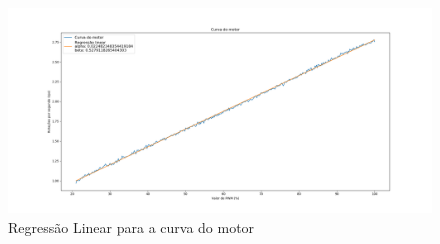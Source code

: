 \begin{figure}[!ht]
\centering
\caption{Regressão Linear para a curva do motor}
		\centering
		\includegraphics[trim={5cm 1cm 5cm 2cm},clip,
scale=0.25]{Figuras/Curva_Do_Motor_rps}
\end{figure}